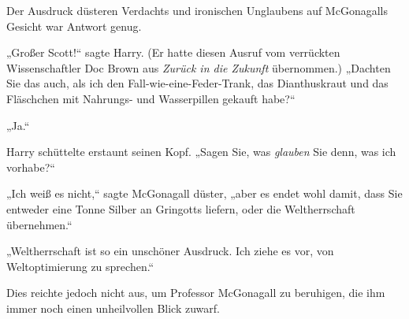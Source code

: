 Der Ausdruck düsteren Verdachts und ironischen Unglaubens auf McGonagalls Gesicht war Antwort genug.

„Großer Scott!“ sagte Harry. (Er hatte diesen Ausruf vom verrückten Wissenschaftler Doc Brown aus \emph{Zurück in die Zukunft} übernommen.) „Dachten Sie das auch, als ich den Fall-wie-eine-Feder-Trank, das Dianthuskraut und das Fläschchen mit Nahrungs- und Wasserpillen gekauft habe?“

„Ja.“

Harry schüttelte erstaunt seinen Kopf. „Sagen Sie, was \emph{glauben} Sie denn, was ich vorhabe?“

„Ich weiß es nicht,“ sagte McGonagall düster, „aber es endet wohl damit, dass Sie entweder eine Tonne Silber an Gringotts liefern, oder die Weltherrschaft übernehmen.“

„Weltherrschaft ist so ein unschöner Ausdruck. Ich ziehe es vor, von Weltoptimierung zu sprechen.“

Dies reichte jedoch nicht aus, um Professor McGonagall zu beruhigen, die ihm immer noch einen unheilvollen Blick zuwarf.

